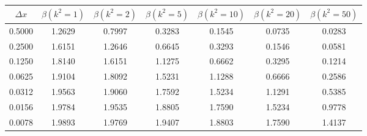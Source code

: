 \begin{tabular}{|c|c|c|c|c|c|c|}
\hline
\textbf{$\Delta x$}&\textbf{$\beta(k^2=1)$}&\textbf{$\beta(k^2=2)$}&\textbf{$\beta(k^2=5)$}&\textbf{$\beta(k^2=10)$}&\textbf{$\beta(k^2=20)$}&\textbf{$\beta(k^2=50)$}\\\hline
0.5000&1.2629&0.7997&0.3283&0.1545&0.0735&0.0283\\\hline
0.2500&1.6151&1.2646&0.6645&0.3293&0.1546&0.0581\\\hline
0.1250&1.8140&1.6151&1.1275&0.6662&0.3295&0.1214\\\hline
0.0625&1.9104&1.8092&1.5231&1.1288&0.6666&0.2586\\\hline
0.0312&1.9563&1.9060&1.7592&1.5234&1.1291&0.5385\\\hline
0.0156&1.9784&1.9535&1.8805&1.7590&1.5234&0.9778\\\hline
0.0078&1.9893&1.9769&1.9407&1.8803&1.7590&1.4137\\\hline
\end{tabular}
